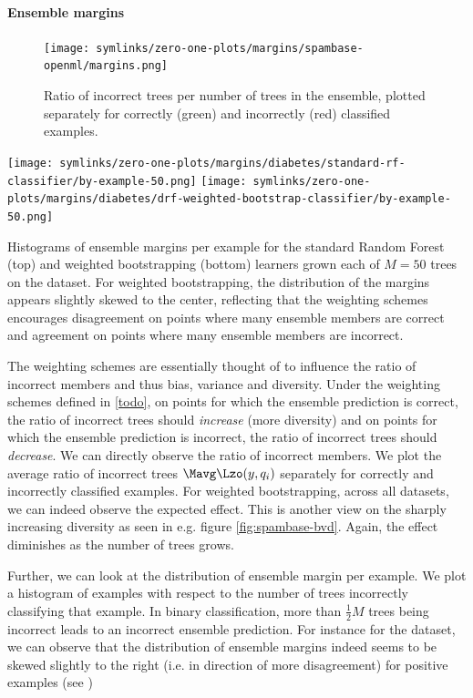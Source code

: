 \documentclass[../main.tex]{subfiles}
\begin{document}
\paragraph{Ensemble margins} 
\begin{figure}
    \texttt{[image: symlinks/zero-one-plots/margins/spambase-openml/margins.png]}
    \caption{
        Ratio of incorrect trees per number of trees in the ensemble, plotted separately for correctly (green) and incorrectly (red) classified examples. 
    }
    \label{fig:mnist-en}
\end{figure}
\begin{marginfigure}
    \texttt{[image: symlinks/zero-one-plots/margins/diabetes/standard-rf-classifier/by-example-50.png]}
    \texttt{[image: symlinks/zero-one-plots/margins/diabetes/drf-weighted-bootstrap-classifier/by-example-50.png]}
    \caption{
        Histograms of ensemble margins per example for the standard Random Forest (top) and weighted bootstrapping (bottom) learners grown each of $M=50$ trees on the \diabetes dataset. For weighted bootstrapping, the distribution of the margins appears slightly skewed to the center, reflecting that the weighting schemes encourages disagreement on points where many ensemble members are correct and agreement on points where many ensemble members are incorrect.
    }
    \label{fig:cover-margins-50}
\end{marginfigure}
The weighting schemes are essentially thought of to influence the ratio of incorrect members and thus bias, variance and diversity. Under the weighting schemes defined in \ref{todo}, on points for which the ensemble prediction is correct, the ratio of incorrect trees should \textit{increase} (more diversity) and on points for which the ensemble prediction is incorrect, the ratio of incorrect trees should \textit{decrease}.
We can directly observe the ratio of incorrect members. We plot the average ratio of incorrect trees $\Mavg \Lzo(y, q_i)$ separately for correctly and incorrectly classified examples. For weighted bootstrapping, across all datasets, we can indeed observe the expected effect. This is another view on the sharply increasing diversity as seen in e.g. figure \ref{fig:spambase-bvd}. Again, the effect diminishes as the number of trees grows.

Further, we can look at the distribution of ensemble margin per example. We plot a histogram of examples with respect to the number of trees incorrectly classifying that example. In binary classification, more than $\frac{1}{2}M$ trees being incorrect leads to an incorrect ensemble prediction. %
For instance for the \cover dataset, we can observe that the distribution of ensemble margins indeed seems to be skewed slightly to the right (i.e. in direction of more disagreement) for positive examples (see )
\end{document}
